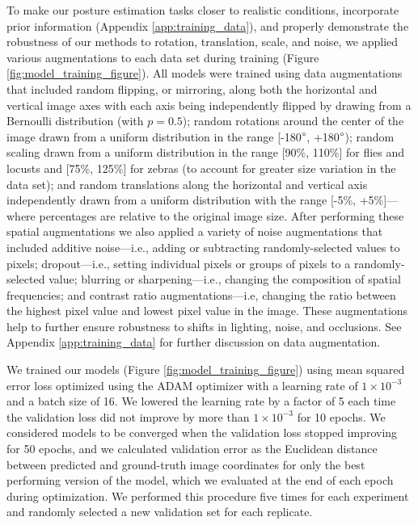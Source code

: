 \documentclass[11pt,a4paper,twoside]{book}
\begin{document}
\begin{doublespace}
To make our posture estimation tasks closer to realistic conditions, incorporate prior information (Appendix \ref{app:training_data}), and properly demonstrate the robustness of our methods to rotation, translation, scale, and noise, we applied various augmentations to each data set during training (Figure \ref{fig:model_training_figure}). All models were trained using data augmentations that included random flipping, or mirroring, along both the horizontal and vertical image axes with each axis being independently flipped by drawing from a Bernoulli distribution (with $p=0.5$); random rotations around the center of the image drawn from a uniform distribution in the range [-180$\degree$, +180$\degree$); random scaling drawn from a uniform distribution in the range [90\%, 110\%] for flies and locusts and [75\%, 125\%] for zebras (to account for greater size variation in the data set); and random translations along the horizontal and vertical axis independently drawn from a uniform distribution with the range [-5\%, +5\%]---where percentages are relative to the original image size. After performing these spatial augmentations we also applied a variety of noise augmentations that included additive noise---i.e., adding or subtracting randomly-selected values to pixels; dropout---i.e., setting individual pixels or groups of pixels to a randomly-selected value; blurring or sharpening---i.e., changing the composition of spatial frequencies; and contrast ratio augmentations---i.e, changing the ratio between the highest pixel value and lowest pixel value in the image. These augmentations help to further ensure robustness to shifts in lighting, noise, and occlusions. See Appendix \ref{app:training_data} for further discussion on data augmentation.

We trained our models (Figure \ref{fig:model_training_figure}) using mean squared error loss optimized using the ADAM optimizer \citep{kingma2014adam} with a learning rate of $1\times10^{-3}$ and a batch size of 16. We lowered the learning rate by a factor of 5 each time the validation loss did not improve by more than $1\times10^{-3}$ for 10 epochs. We considered models to be converged when the validation loss stopped improving for 50 epochs, and we calculated validation error as the Euclidean distance between predicted and ground-truth image coordinates for only the best performing version of the model, which we evaluated at the end of each epoch during optimization. We performed this procedure five times for each experiment and randomly selected a new validation set for each replicate.


\end{doublespace}
\end{document}
